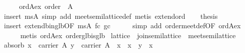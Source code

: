 \begin{isabellebody}
%
\isadelimproof
%
\endisadelimproof
%
\isatagproof
{}\isamarkupfalse%
\ {}\isanewline
\ \ \isamarkupfalse%
\ ord{}A{}ex{}\ {}order\ {}{}\ A{}{}\isanewline
\ \ \ \ \isamarkupfalse%
\ {}insert\ ms{}A{}\ simp\ add{}\ meet{}semilattice{}def{}\ metis\ extend{}ord{}\isanewline
\ \ \isamarkupfalse%
\ {}thesis\isanewline
\ \ \ \ \isamarkupfalse%
\ {}insert\ extend{}binglb{}OF\ ms{}A\ fc\ gc{}{}\isanewline
\ \ \ \ \isamarkupfalse%
\ {}simp\ add{}\ order{}meet{}def{}OF\ ord{}A{}ex{}{}\isanewline
\ \ \ \ \isamarkupfalse%
\ {}metis\ ord{}A{}ex\ order{}glb{}is{}glb{}\isanewline
{}\isamarkupfalse%
%
\endisatagproof
{\isafoldproof}%
%
\isadelimproof
%
\endisadelimproof
%
\isamarkuptrue%
\isamarkupfalse%
\ lattice\ {}\ join{}semilattice\ {}\ meet{}semilattice\isanewline
\isanewline
{}\isanewline
\isanewline
\ \ \isamarkupfalse%
\ absorb{}{}\ {}{}x\ {}\ carrier\ A{}\ y\ {}\ carrier\ A{}\ {}\ x\ {}\ {}x\ {}\ y{}\ {}\ x{}\isanewline

\end{isabellebody}
